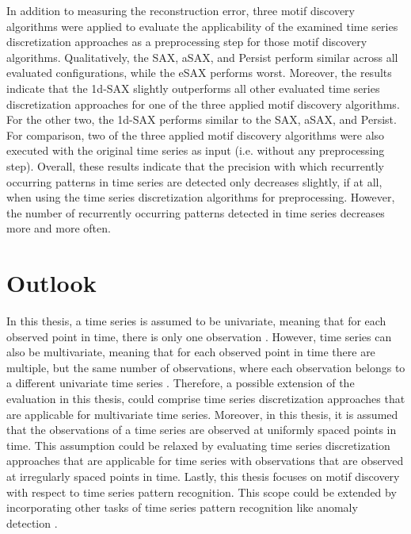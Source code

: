 In addition to measuring the reconstruction error, three motif discovery algorithms were applied to evaluate the applicability of the examined time series discretization approaches as a preprocessing step for those motif discovery algorithms. Qualitatively, the \ac{SAX}, \ac{aSAX}, and Persist perform similar across all evaluated configurations, while the \ac{eSAX} performs worst. Moreover, the results indicate that the \ac{1d-SAX} slightly outperforms all other evaluated time series discretization approaches for one of the three applied motif discovery algorithms. For the other two, the \ac{1d-SAX} performs similar to the \ac{SAX}, \ac{aSAX}, and Persist. \newline
For comparison, two of the three applied motif discovery algorithms were also executed with the original time series as input (i.e. without any preprocessing step). Overall, these results indicate that the precision with which recurrently occurring patterns in time series are detected only decreases slightly, if at all, when using the time series discretization algorithms for preprocessing. However, the number of recurrently occurring patterns detected in time series decreases more and more often.
\section{Outlook}
In this thesis, a time series is assumed to be univariate, meaning that for each observed point in time, there is only one observation \cite{Survey_Esling}. However, time series can also be multivariate, meaning that for each observed point in time there are multiple, but the same number of observations, where each observation belongs to a different univariate time series \cite{Survey_Esling}. Therefore, a possible extension of the evaluation in this thesis, could comprise time series discretization approaches that are applicable for multivariate time series. \newline
Moreover, in this thesis, it is assumed that the observations of a time series are observed at uniformly spaced points in time. This assumption could be relaxed by evaluating time series discretization approaches that are applicable for time series with observations that are observed at irregularly spaced points in time. \newline
Lastly, this thesis focuses on motif discovery with respect to time series pattern recognition. This scope could be extended by incorporating other tasks of time series pattern recognition like anomaly detection \cite{Survey_Esling}. 
 